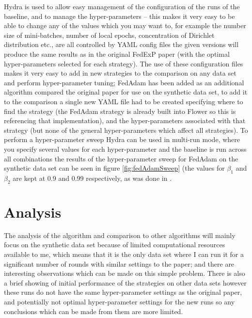 \documentclass{article}
\begin{document}
Hydra is used to allow easy management of the configuration of the runs of the baseline, and to manage the hyper-parameters -- this makes it very easy to be able to change any of the values which you may want to, for example the number size of mini-batches, number of local epochs, concentration of Dirichlet distribution etc., are all controlled by YAML config files the given versions will produce the same results as in the original FedExP paper (with the optimal hyper-parameters selected for each strategy).  The use of these configuration files makes it very easy to add in new strategies to the comparison on any data set and perform hyper-parameter tuning; FedAdam has been added as an additional algorithm compared the original paper for use on the synthetic data set, to add it to the comparison a single new YAML file had to be created specifying where to find the strategy (the FedAdam strategy is already built into Flower so this is referencing that implementation), and the hyper-parameters associated with that strategy (but none of the general hyper-parameters which affect all strategies).  To perform a hyper-parameter sweep Hydra can be used in multi-run mode, where you specify several values for each hyper-parameter and the baseline is run across all combinations the results of the hyper-parameter sweep for FedAdam on the synthetic data set can be seen in figure \ref{fig:fedAdamSweep} (the values for $\beta_1$ and $\beta_2$ are kept at 0.9 and 0.99 respectively, as was done in \cite{AdaptiveFederatedOptimisation}.

\section{Analysis}

The analysis of the algorithm and comparison to other algorithms will mainly focus on the synthetic data set because of limited computational resources available to me, which means that it is the only data set where I can run it for a significant number of rounds with similar settings to the paper; and there are interesting observations which can be made on this simple problem.  There is also a brief showing of initial performance of the strategies on other data sets however these runs do not have the same hyper-parameter settings as the original paper, and potentially not optimal hyper-parameter settings for the new runs so any conclusions which can be made from them are more limited.
\end{document}
